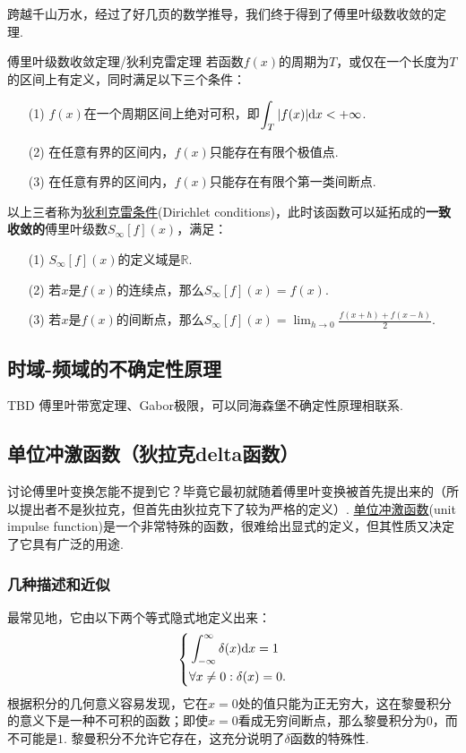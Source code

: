 \documentclass[main.tex]{subfiles}
\begin{document}
跨越千山万水，经过了好几页的数学推导，我们终于得到了傅里叶级数收敛的定理.
\begin{theorem}{傅里叶级数收敛定理/狄利克雷定理}
    若函数\(f(x)\)的周期为\(T\)，或仅在一个长度为\(T\)的区间上有定义，同时满足以下三个条件：
    \begin{itemize}
        \item [(1)] \(f(x)\)在一个周期区间上绝对可积，即\(\displaystyle{\int_{T} |f(x)|{\rm d}x < +\infty}\).
        \item [(2)] 在任意有界的区间内，\(f(x)\)只能存在有限个极值点.
        \item [(3)] 在任意有界的区间内，\(f(x)\)只能存在有限个第一类间断点.
    \end{itemize}
    以上三者称为\uline{狄利克雷条件}(Dirichlet conditions)，此时该函数可以延拓成的\textbf{一致收敛的}傅里叶级数\(S_{\infty}[f](x)\)，满足：
    \begin{itemize}
        \item [(1)] \(S_{\infty}[f](x)\)的定义域是\(\mathbb{R}\).
        \item [(2)] 若\(x\)是\(f(x)\)的连续点，那么\(S_{\infty}[f](x)=f(x)\).
        \item [(3)] 若\(x\)是\(f(x)\)的间断点，那么\(\displaystyle{S_{\infty}[f](x)=\lim_{h \to 0}\frac{f(x+h)+f(x-h)}{2}}\).
    \end{itemize}
\end{theorem}


\subsection{时域-频域的不确定性原理}
TBD
傅里叶带宽定理、Gabor极限，可以同海森堡不确定性原理相联系.

\subsection{单位冲激函数（狄拉克delta函数）}

讨论傅里叶变换怎能不提到它？毕竟它最初就随着傅里叶变换被首先提出来的（所以提出者不是狄拉克，但首先由狄拉克下了较为严格的定义）. \uline{单位冲激函数}(unit impulse function)是一个非常特殊的函数，很难给出显式的定义，但其性质又决定了它具有广泛的用途.

\subsubsection{几种描述和近似}

最常见地，它由以下两个等式隐式地定义出来：
\[\left\{\begin{aligned} & \int_{-\infty}^{\infty}\delta(x){\rm d}x=1 \\ & \forall x \neq 0: \delta(x)=0. \end{aligned}\right.\]
根据积分的几何意义容易发现，它在\(x=0\)处的值只能为正无穷大，这在黎曼积分的意义下是一种不可积的函数；即使\(x=0\)看成无穷间断点，那么黎曼积分为\(0\)，而不可能是\(1\). 黎曼积分不允许它存在，这充分说明了\(\delta\)函数的特殊性.
\end{document}

